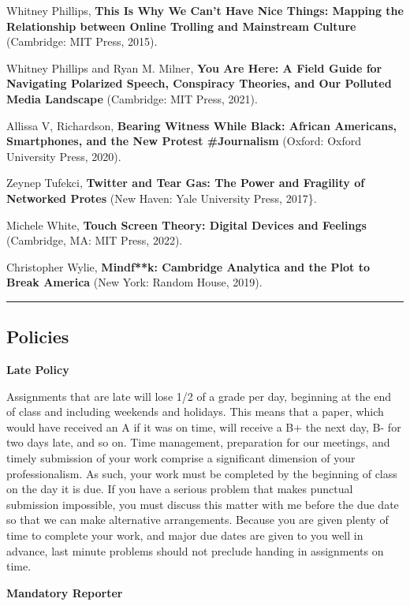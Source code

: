 \documentclass[
  letterpaper,
  DIV=11,
  numbers=noendperiod,
  oneside]{scrartcl}
\begin{document}
Whitney Phillips, \textbf{This Is Why We Can't Have Nice Things: Mapping
the Relationship between Online Trolling and Mainstream Culture}
(Cambridge: MIT Press, 2015).

Whitney Phillips and Ryan M. Milner, \textbf{You Are Here: A Field Guide
for Navigating Polarized Speech, Conspiracy Theories, and Our Polluted
Media Landscape} (Cambridge: MIT Press, 2021).

Allissa V, Richardson, \textbf{Bearing Witness While Black: African
Americans, Smartphones, and the New Protest \#Journalism} (Oxford:
Oxford University Press, 2020).

Zeynep Tufekci, \textbf{Twitter and Tear Gas: The Power and Fragility of
Networked Protes} (New Haven: Yale University Press, 2017\}.

Michele White, \textbf{Touch Screen Theory: Digital Devices and
Feelings} (Cambridge, MA: MIT Press, 2022).

Christopher Wylie, \textbf{Mindf**k: Cambridge Analytica and the Plot to
Break America} (New York: Random House, 2019).

\begin{center}\rule{0.5\linewidth}{0.5pt}\end{center}

\subsection{Policies}\label{policies}

\textbf{Late Policy}

Assignments that are late will lose 1/2 of a grade per day, beginning at
the end of class and including weekends and holidays. This means that a
paper, which would have received an A if it was on time, will receive a
B+ the next day, B- for two days late, and so on. Time management,
preparation for our meetings, and timely submission of your work
comprise a significant dimension of your professionalism. As such, your
work must be completed by the beginning of class on the day it is due.
If you have a serious problem that makes punctual submission impossible,
you must discuss this matter with me before the due date so that we can
make alternative arrangements. Because you are given plenty of time to
complete your work, and major due dates are given to you well in
advance, last minute problems should not preclude handing in assignments
on time.

\textbf{Mandatory Reporter}
\end{document}
